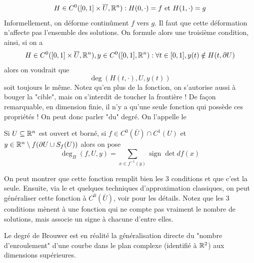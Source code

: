 \documentclass[memoire.tex]{subfiles}
\begin{document}
\begin{equation*}
    H\in C^0([0,1]\times\overline{U},\mathbb{R}^n): H(0,\cdot)=f \text{ et } H(1,\cdot)=g
\end{equation*}
Informellement, on déforme continûment $f$ vers $g$. Il faut que cette déformation n'affecte pas l'ensemble des solutions. On formule alors une troisième condition, ainsi, si on a 
\begin{equation*}
    H\in C^0([0,1]\times \overline{U},\mathbb{R}^n), y\in C^0([0,1],\mathbb{R}^n): \forall t\in [0,1], y(t)\notin H(t,\partial U)
\end{equation*}
alors  on voudrait que 
\begin{equation*}
    \operatorname{deg}(H(t,\cdot),U,y(t))
\end{equation*}
soit toujours le même. Notez qu'en plus de la fonction, on s'autorise aussi à bouger la "cible", mais on s'interdit de toucher la frontière !
De façon remarquable, en dimension finie, il n'y a qu'une seule fonction qui possède ces propriétés ! On peut donc parler "du" degré. On l'appelle le 

\begin{definition}
    Si $U\subseteq \mathbb{R}^n$ est ouvert et borné, si $f\in C^0(\bar{U})\cap C^1(U)$ et $y\in \mathbb{R}^n\setminus f(\partial U \cup S_f(U))$ alors on pose 
    \begin{equation*}
        \operatorname{deg}_B(f,U,y)=\sum_{x\in f^{-1}(y)} \operatorname*{sign} \det df(x)
    \end{equation*}
\end{definition}
On peut montrer que cette fonction remplit bien les 3 
conditions et que c'est la seule. Ensuite, via le 
 et quelques techniques 
d'approximation classiques, on peut généraliser cette 
fonction à $C^0(\bar{U})$, voir \cite{KlausNonLin85} pour 
les détails. Notez que les 3 conditions mènent à une 
fonction qui ne compte pas vraiment le nombre de 
solutions, mais associe un signe à chacune d'entre elles.

\begin{remarque}
    Le degré de Brouwer est en réalité la généralisation directe du "nombre d'enroulement" d'une courbe dans le plan complexe (identifié à $\mathbb{R}^2$) aux dimensions supérieures.
\end{remarque}
\end{document}
